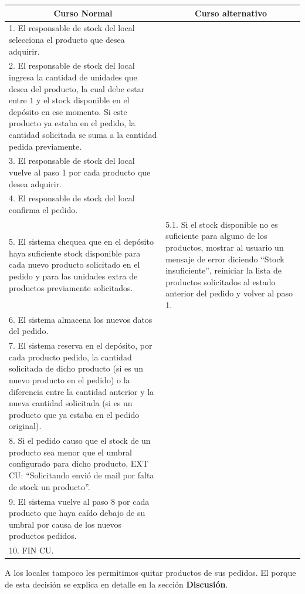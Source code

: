 \begin{center}
\begin{tabular}{|p{}|p{}|}
    \hline
    \multicolumn{1}{|c|}{Curso Normal} &
    \multicolumn{1}{|c|}{Curso alternativo} \\
    \hline
	1. El responsable de stock del local selecciona el producto que desea adquirir. & \\
	2. El responsable de stock del local ingresa la cantidad de unidades que desea del producto, la cual debe estar entre $1$ y el stock disponible en el depósito en ese momento. Si este producto ya estaba en el pedido, la cantidad solicitada se suma a la cantidad pedida previamente. & \\
	3. El responsable de stock del local vuelve al paso 1 por cada producto que desea adquirir. & \\
	4. El responsable de stock del local confirma el pedido. & \\
	5. El sistema chequea que en el depósito haya suficiente stock disponible para cada nuevo producto solicitado en el pedido y para las unidades extra de productos previamente solicitados. &
	5.1. Si el stock disponible no es suficiente para alguno de los productos, mostrar al usuario un mensaje de error diciendo ``Stock insuficiente'', reiniciar la lista de productos solicitados al estado anterior del pedido y volver al paso 1. \\
	6. El sistema almacena los nuevos datos del pedido. & \\
	7. El sistema reserva en el depósito, por cada producto pedido, la cantidad solicitada de dicho producto (si es un nuevo producto en el pedido) o la diferencia entre la cantidad anterior y la nueva cantidad solicitada (si es un producto que ya estaba en el pedido original). & \\
	8. Si el pedido causo que el stock de un producto sea menor que el umbral configurado para dicho producto, EXT CU: ``Solicitando envió de mail por falta de stock un producto''. & \\
	9. El sistema vuelve al paso 8 por cada producto que haya caído debajo de su umbral por causa de los nuevos productos pedidos. & \\
	10. FIN CU. & \\
    \hline
\end{tabular}
\end{center}

A los locales tampoco les permitimos quitar productos de sus pedidos. El porque de esta decisión se explica en detalle en la sección \textbf{Discusión}.


